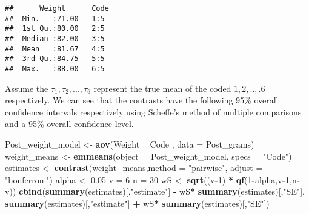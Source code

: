 \documentclass[12pt,]{article}
\newenvironment{Shaded}{\begin{snugshade}}{\end{snugshade}}
\newcommand{\KeywordTok}[1]{\textcolor[rgb]{0.13,0.29,0.53}{\textbf{#1}}}
\newcommand{\DataTypeTok}[1]{\textcolor[rgb]{0.13,0.29,0.53}{#1}}
\newcommand{\DecValTok}[1]{\textcolor[rgb]{0.00,0.00,0.81}{#1}}
\newcommand{\FloatTok}[1]{\textcolor[rgb]{0.00,0.00,0.81}{#1}}
\newcommand{\StringTok}[1]{\textcolor[rgb]{0.31,0.60,0.02}{#1}}
\newcommand{\OperatorTok}[1]{\textcolor[rgb]{0.81,0.36,0.00}{\textbf{#1}}}
\newcommand{\NormalTok}[1]{#1}
\begin{document}
\begin{Shaded}
\end{Shaded}

\begin{verbatim}
##      Weight      Code 
##  Min.   :71.00   1:5  
##  1st Qu.:80.00   2:5  
##  Median :82.00   3:5  
##  Mean   :81.67   4:5  
##  3rd Qu.:84.75   5:5  
##  Max.   :88.00   6:5
\end{verbatim}

Assume the \(\tau_1,\tau_2,...,\tau_6\) represent the true mean of the
coded \(1,2,..,.6\) respectively. We can see that the contrasts have the
following 95\% overall confidence intervals respectively using Scheffe's
method of multiple comparisons and a 95\% overall confidence level.

\begin{Shaded}
\begin{Highlighting}[]
\NormalTok{Post_weight_model <-}\StringTok{ }\KeywordTok{aov}\NormalTok{(Weight }\OperatorTok{~}\StringTok{ }\NormalTok{Code , }\DataTypeTok{data =}\NormalTok{ Post_grams)}
\NormalTok{weight_means <-}\StringTok{ }\KeywordTok{emmeans}\NormalTok{(}\DataTypeTok{object =}\NormalTok{ Post_weight_model, }\DataTypeTok{specs =} \StringTok{"Code"}\NormalTok{)}
\NormalTok{estimates <-}\StringTok{ }\KeywordTok{contrast}\NormalTok{(weight_means,}\DataTypeTok{method =} \StringTok{"pairwise"}\NormalTok{, }\DataTypeTok{adjust =} \StringTok{"bonferroni"}\NormalTok{)}
\NormalTok{alpha <-}\StringTok{ }\FloatTok{0.05}
\NormalTok{v =}\StringTok{ }\DecValTok{6}
\NormalTok{n =}\StringTok{ }\DecValTok{30}
\NormalTok{wS <-}\StringTok{ }\KeywordTok{sqrt}\NormalTok{((v}\OperatorTok{-}\DecValTok{1}\NormalTok{) }\OperatorTok{*}\StringTok{ }\KeywordTok{qf}\NormalTok{(}\DecValTok{1}\OperatorTok{-}\NormalTok{alpha,v}\OperatorTok{-}\DecValTok{1}\NormalTok{,n}\OperatorTok{-}\NormalTok{v))}
\KeywordTok{cbind}\NormalTok{(}\KeywordTok{summary}\NormalTok{(estimates)[,}\StringTok{"estimate"}\NormalTok{] }\OperatorTok{-}\StringTok{ }\NormalTok{wS}\OperatorTok{*}\StringTok{ }\KeywordTok{summary}\NormalTok{(estimates)[,}\StringTok{"SE"}\NormalTok{],}
      \KeywordTok{summary}\NormalTok{(estimates)[,}\StringTok{"estimate"}\NormalTok{] }\OperatorTok{+}\StringTok{ }\NormalTok{wS}\OperatorTok{*}\StringTok{ }\KeywordTok{summary}\NormalTok{(estimates)[,}\StringTok{"SE"}\NormalTok{])}
\end{Highlighting}
\end{Shaded}
\end{document}
